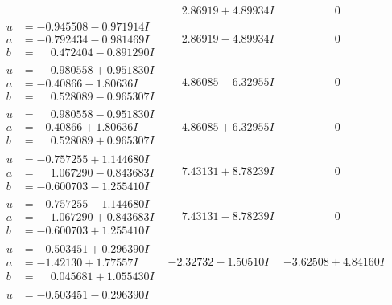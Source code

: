 \documentclass[1p]{elsarticle_modified}
\theoremstyle{definition}
\begin{document}
$$\begin{array}{c|c|c}
 & \phantom{-}2.86919 + 4.89934 I & \phantom{-0.000000 } 0 \\ \hline\begin{aligned}
u &= -0.945508 - 0.971914 I \\
a &= -0.792434 - 0.981469 I \\
b &= \phantom{-}0.472404 - 0.891290 I\end{aligned}
 & \phantom{-}2.86919 - 4.89934 I & \phantom{-0.000000 } 0 \\ \hline\begin{aligned}
u &= \phantom{-}0.980558 + 0.951830 I \\
a &= -0.40866 - 1.80636 I \\
b &= \phantom{-}0.528089 - 0.965307 I\end{aligned}
 & \phantom{-}4.86085 - 6.32955 I & \phantom{-0.000000 } 0 \\ \hline\begin{aligned}
u &= \phantom{-}0.980558 - 0.951830 I \\
a &= -0.40866 + 1.80636 I \\
b &= \phantom{-}0.528089 + 0.965307 I\end{aligned}
 & \phantom{-}4.86085 + 6.32955 I & \phantom{-0.000000 } 0 \\ \hline\begin{aligned}
u &= -0.757255 + 1.144680 I \\
a &= \phantom{-}1.067290 - 0.843683 I \\
b &= -0.600703 - 1.255410 I\end{aligned}
 & \phantom{-}7.43131 + 8.78239 I & \phantom{-0.000000 } 0 \\ \hline\begin{aligned}
u &= -0.757255 - 1.144680 I \\
a &= \phantom{-}1.067290 + 0.843683 I \\
b &= -0.600703 + 1.255410 I\end{aligned}
 & \phantom{-}7.43131 - 8.78239 I & \phantom{-0.000000 } 0 \\ \hline\begin{aligned}
u &= -0.503451 + 0.296390 I \\
a &= -1.42130 + 1.77557 I \\
b &= \phantom{-}0.045681 + 1.055430 I\end{aligned}
 & -2.32732 - 1.50510 I & -3.62508 + 4.84160 I \\ \hline\begin{aligned}
u &= -0.503451 - 0.296390 I \\

\end{aligned}
\end{array}$$
\end{document}
